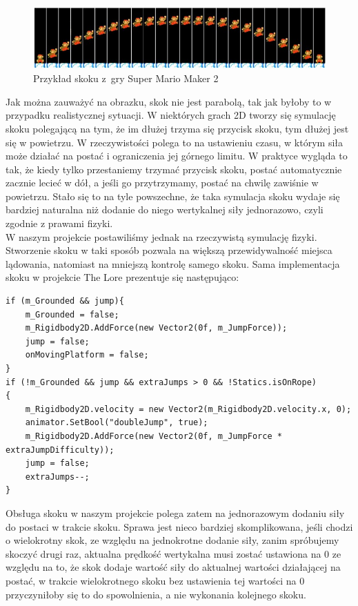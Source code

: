 \documentclass[oneside,polski,logo]{amuthesis}
\begin{document}
\begin{figure}[h]
	\centering
	\includegraphics[width=13cm]{images/kozubal/mario.jpg}
	\caption{Przykład skoku z~gry Super Mario Maker 2 \cite{jumping3}}
\end{figure}

\newpage
Jak można zauważyć na obrazku, skok nie jest parabolą, tak jak byłoby to w przypadku realistycznej sytuacji. W niektórych grach 2D tworzy się symulację skoku polegającą na tym, że im dłużej trzyma się przycisk skoku, tym dłużej jest się w powietrzu. W rzeczywistości polega to na ustawieniu czasu, w którym siła może działać na postać i ograniczenia jej górnego limitu. W praktyce wygląda to tak, że kiedy tylko przestaniemy trzymać przycisk skoku, postać automatycznie zacznie lecieć w dół, a jeśli go przytrzymamy, postać na chwilę zawiśnie w powietrzu. Stało się to na tyle powszechne, że taka symulacja skoku wydaje się bardziej naturalna niż dodanie do niego wertykalnej siły jednorazowo, czyli zgodnie z prawami fizyki. \cite{jumping2} \\ W naszym projekcie postawiliśmy jednak na rzeczywistą symulację fizyki. Stworzenie skoku w taki sposób pozwala na większą przewidywalność miejsca lądowania, natomiast na mniejszą kontrolę samego skoku. Sama implementacja skoku w projekcie The Lore prezentuje się następująco:

\begin{lstlisting}[breaklines=true,
language={[Sharp]C},
rulecolor=\color{blue!80!black},
caption={Fragment klasy \texttt{CharacterController.cs}}
]
if (m_Grounded && jump){
	m_Grounded = false;
	m_Rigidbody2D.AddForce(new Vector2(0f, m_JumpForce));
	jump = false;
	onMovingPlatform = false;
}
if (!m_Grounded && jump && extraJumps > 0 && !Statics.isOnRope)
{
	m_Rigidbody2D.velocity = new Vector2(m_Rigidbody2D.velocity.x, 0);
	animator.SetBool("doubleJump", true);
	m_Rigidbody2D.AddForce(new Vector2(0f, m_JumpForce * extraJumpDifficulty));
	jump = false;
	extraJumps--;
}
\end{lstlisting}
\newpage
Obsługa skoku w naszym projekcie polega zatem na jednorazowym dodaniu siły do postaci w trakcie skoku. Sprawa jest nieco bardziej skomplikowana, jeśli chodzi o wielokrotny skok, ze względu na jednokrotne dodanie siły, zanim spróbujemy skoczyć drugi raz, aktualna prędkość wertykalna musi zostać ustawiona na 0 ze względu na to, że skok dodaje wartość siły do aktualnej wartości działającej na postać, w trakcie wielokrotnego skoku bez ustawienia tej wartości na 0 przyczyniłoby się to do spowolnienia, a nie wykonania kolejnego skoku.
\end{document}
